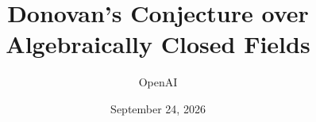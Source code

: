 \documentclass[11pt]{article}
\title{Donovan's Conjecture over Algebraically Closed Fields}
\author{OpenAI}
\date{September 24, 2026}
\begin{document}
\maketitle

\clearpage
\begingroup
\small
\tableofcontents
\endgroup
\clearpage









\end{document}
